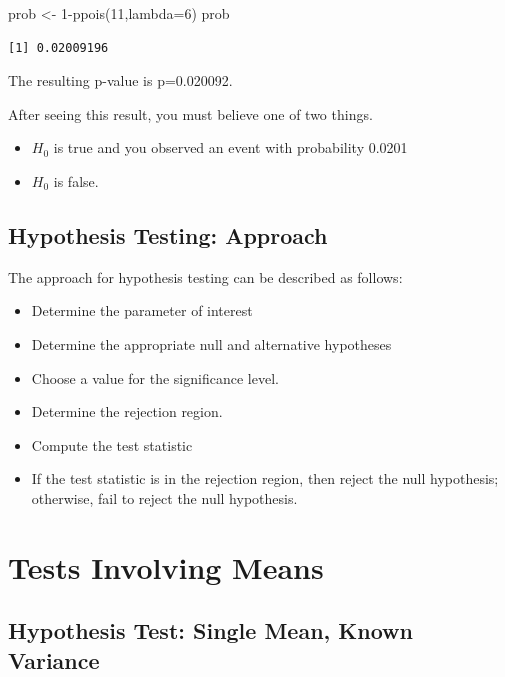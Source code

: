 \documentclass[
  letterpaper,
  DIV=11,
  numbers=noendperiod]{scrartcl}
\newenvironment{Shaded}{\begin{snugshade}}{\end{snugshade}}
\newcommand{\AttributeTok}[1]{\textcolor[rgb]{0.40,0.45,0.13}{#1}}
\newcommand{\DecValTok}[1]{\textcolor[rgb]{0.68,0.00,0.00}{#1}}
\newcommand{\FunctionTok}[1]{\textcolor[rgb]{0.28,0.35,0.67}{#1}}
\newcommand{\NormalTok}[1]{\textcolor[rgb]{0.00,0.23,0.31}{#1}}
\newcommand{\OtherTok}[1]{\textcolor[rgb]{0.00,0.23,0.31}{#1}}
\newcommand{\SpecialCharTok}[1]{\textcolor[rgb]{0.37,0.37,0.37}{#1}}
\providecommand{\tightlist}{%
  \setlength{\itemsep}{0pt}\setlength{\parskip}{0pt}}
\begin{document}
\begin{Shaded}
\begin{Highlighting}[]
\NormalTok{prob }\OtherTok{\textless{}{-}} \DecValTok{1}\SpecialCharTok{{-}}\FunctionTok{ppois}\NormalTok{(}\DecValTok{11}\NormalTok{,}\AttributeTok{lambda=}\DecValTok{6}\NormalTok{)}
\NormalTok{prob}
\end{Highlighting}
\end{Shaded}

\begin{verbatim}
[1] 0.02009196
\end{verbatim}

The resulting p-value is p=0.020092.

After seeing this result, you must believe one of two things.

\begin{itemize}
\tightlist
\item
  \(H_0\) is true and you observed an event with probability 0.0201
\item
  \(H_0\) is false.
\end{itemize}

\subsection{Hypothesis Testing:
Approach}\label{hypothesis-testing-approach}

The approach for hypothesis testing can be described as follows:

\begin{itemize}
\tightlist
\item
  Determine the parameter of interest
\item
  Determine the appropriate null and alternative hypotheses
\item
  Choose a value for the significance level.
\item
  Determine the rejection region.
\item
  Compute the test statistic
\item
  If the test statistic is in the rejection region, then reject the null
  hypothesis; otherwise, fail to reject the null hypothesis.
\end{itemize}

\section{Tests Involving Means}\label{tests-involving-means}

\subsection{Hypothesis Test: Single Mean, Known
Variance}\label{hypothesis-test-single-mean-known-variance}
\end{document}
